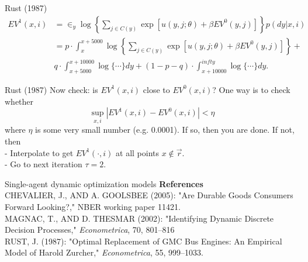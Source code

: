 \documentclass[xcolor=pdftex,dvipsnames,table,mathserif]{beamer}
\begin{document}
\begin{frame}{Rust (1987)}
\begin{equation*}
\begin{split}
EV^1 (x, i) & = \in_y \log \left \{ \sum_{j \in C(y)} \exp [u(y, j;\theta) + \beta EV^0 (y, j)] \right \} p(dy |x,i) \\
& = p \cdot \int^{x + 5000}_x \log\left \{ \sum_{j \in C(y)} \exp [u(y, j;\theta) + \beta EV^0 (y, j)] \right \} + \\
& q \cdot \int^{x + 10000}_{x+ 5000} \log \{ \cdots \} dy + (1 - p - q) \cdot \int^{infty}_{x + 10000} \log \{ \cdots \} dy. 
\end{split}
\end{equation*}
\end{frame}

\begin{frame}{Rust (1987)}
Now check: is $EV^1 (x, i)$ close to $EV^0(x, i)$? One way is to check whether 
\begin{equation*}
\sup_{x,i} | EV^1 (x, i) - EV^0 (x, i) | < \eta
\end{equation*}
where $\eta$ is some very small number (e.g. 0.0001). If so, then you are done. If not, then \\
\vspace{2mm}
\quad - Interpolate to get $EV^1 (\cdot, i)$ at all points $x \notin \vec r$. \\
\vspace{2mm}
\quad  - Go to next iteration $\tau = 2$. 
\end{frame}

\begin{frame}{Single-agent dynamic optimization models}
\vspace{.5mm}
\textbf{References}\\
\vspace{3mm}
CHEVALIER, J., AND A. GOOLSBEE (2005): "Are Durable Goods Consumers Forward Looking?," NBER working paper 11421.\\
\vspace{3mm}
MAGNAC, T., AND D. THESMAR (2002): "Identifying Dynamic Discrete Decision Processes," \emph{Econometrica}, 70, 801--816 \\
\vspace{3mm}
RUST, J. (1987): "Optimal Replacement of GMC Bus Engines: An Empirical Model of Harold Zurcher," \emph{Econometrica}, 55, 999--1033.
\end{frame}
\end{document}
